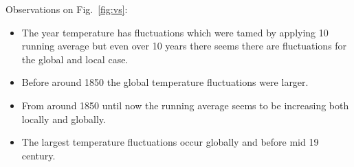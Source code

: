 \documentclass{article}
\begin{document}
Observations on  Fig.~\ref{fig:vs}:
\begin{itemize}
\item The year temperature has fluctuations which were tamed by applying 
10 running average but even over 10 years there seems there are fluctuations 
for the global and local case. 
\item Before around 1850 the global temperature fluctuations were larger. 
\item From around 1850  until now the running average seems to be increasing both 
locally and globally. 
\item The largest temperature fluctuations occur globally and before mid 19 century. 
\end{itemize}



\end{document}
